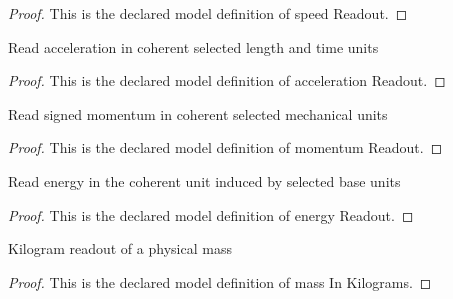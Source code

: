 \begin{proof}
  This is the declared model definition of speed Readout.
\end{proof}
\begin{definition}
  \label{def:physics:phyx-mini-0764:phyxminiproblems-problemphyxmini0764-accelerationreadout}
  Read acceleration in coherent selected length and time units
\end{definition}
\begin{proof}
  This is the declared model definition of acceleration Readout.
\end{proof}
\begin{definition}
  \label{def:physics:phyx-mini-0764:phyxminiproblems-problemphyxmini0764-momentumreadout}
  Read signed momentum in coherent selected mechanical units
\end{definition}
\begin{proof}
  This is the declared model definition of momentum Readout.
\end{proof}
\begin{definition}
  \label{def:physics:phyx-mini-0764:phyxminiproblems-problemphyxmini0764-energyreadout}
  Read energy in the coherent unit induced by selected base units
\end{definition}
\begin{proof}
  This is the declared model definition of energy Readout.
\end{proof}
\begin{definition}
  \label{def:physics:phyx-mini-0764:phyxminiproblems-problemphyxmini0764-massinkilograms}
  Kilogram readout of a physical mass
\end{definition}
\begin{proof}
  This is the declared model definition of mass In Kilograms.
\end{proof}
